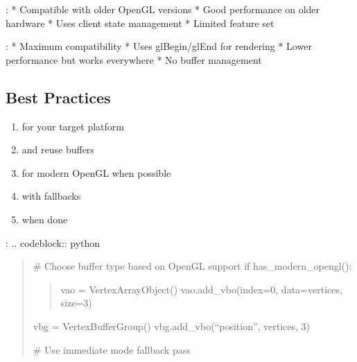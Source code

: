 \documentclass[a4paper,10pt,english,openany,oneside]{sphinxmanual}
\begin{document}
\sphinxAtStartPar
{}:
* Compatible with older OpenGL versions
* Good performance on older hardware
* Uses client state management
* Limited feature set

\sphinxAtStartPar
{}:
* Maximum compatibility
* Uses glBegin/glEnd for rendering
* Lower performance but works everywhere
* No buffer management


\subsection{Best Practices}
\label{\detokenize{api/buffers:best-practices}}\begin{enumerate}
%
\item {} 
\sphinxAtStartPar
{} for your target platform

\item {} 
\sphinxAtStartPar
{} and reuse buffers

\item {} 
\sphinxAtStartPar
{} for modern OpenGL when possible

\item {} 
\sphinxAtStartPar
{} with fallbacks

\item {} 
\sphinxAtStartPar
{} when done

\end{enumerate}

\sphinxAtStartPar
{}:
.. code\sphinxhyphen{}block:: python
\begin{quote}

\sphinxAtStartPar
\# Choose buffer type based on OpenGL support
if has\_modern\_opengl():
\begin{quote}

\sphinxAtStartPar
vao = VertexArrayObject()
vao.add\_vbo(index=0, data=vertices, size=3)
\end{quote}
\begin{description}
\sphinxAtStartPar
vbg = VertexBufferGroup()
vbg.add\_vbo(“position”, vertices, 3)

\sphinxAtStartPar
\# Use immediate mode fallback
pass

\end{description}
\end{quote}
\end{document}
